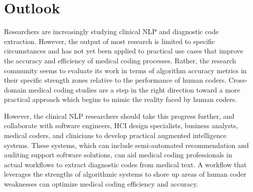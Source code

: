 \documentclass[sigconf]{acmart}
\begin{document}
\section{Outlook}
Researchers are increasingly studying clinical NLP and diagnostic code extraction. However, the output of most research is limited to specific circumstances and has not yet been applied to practical use cases that improve the accuracy and efficiency of medical coding processes. Rather, the research community seems to evaluate its work in terms of algorithm accuracy metrics in their specific strength zones relative to the performance of human coders. Cross-domain medical coding studies are a step in the right direction toward a more practical approach which begins to mimic the reality faced by human coders.

However, the clinical NLP researchers should take this progress further, and collaborate with software engineers, HCI design specialists, business analysts, medical coders, and clinicians to develop practical augmented intelligence systems. These systems, which can include semi-automated recommendation and auditing support software solutions, can aid medical coding professionals in actual workflows to extract diagnostic codes from medical text. A workflow that leverages the strengths of algorithmic systems to shore up areas of human coder weaknesses can optimize medical coding efficiency and accuracy.

 
\end{document}
